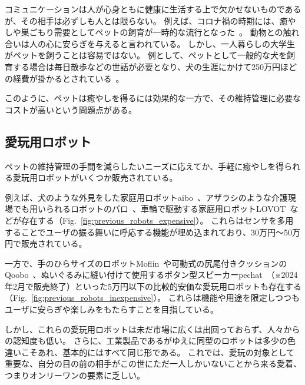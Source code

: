 \documentclass[uplatex,a4paper,12pt]{jsarticle}
\renewcommand{\figurename}{Fig.}
\newcommand{\figref}[1]{\figurename~\ref{#1}}
\begin{document}
コミュニケーションは人が心身ともに健康に生活する上で欠かせないものであるが、その相手は必ずしも人とは限らない。
例えば、コロナ禍の時期には、癒やしや巣ごもり需要としてペットの飼育が一時的な流行となった~\cite{web_pet}。
動物との触れ合いは人の心に安らぎを与えると言われている。
しかし、一人暮らしの大学生がペットを飼うことは容易ではない。
例として、ペットとして一般的な犬を飼育する場合は毎日散歩などの世話が必要となり、犬の生涯にかけて250万円ほどの経費が掛かるとされている~\cite{web_petfood}。

このように、ペットは癒やしを得るには効果的な一方で、その維持管理に必要なコストが高いという問題点がある。


\subsection{愛玩用ロボット}
ペットの維持管理の手間を減らしたいニーズに応えてか、手軽に癒やしを得られる愛玩用ロボットがいくつか販売されている。

例えば、犬のような外見をした家庭用ロボットaibo~\cite{web_aibo}、アザラシのような介護現場でも用いられるロボットのパロ~\cite{web_paro}、車輪で駆動する家庭用ロボットLOVOT~\cite{web_lovot}などが存在する（\figref{fig:previous_robots_expensive}）。
これらはセンサを多用することでユーザの振る舞いに呼応する機能が埋め込まれており、30万円～50万円で販売されている。

一方で、手のひらサイズのロボットMoflin~\cite{web_moflin}や可動式の尻尾付きクッションのQoobo~\cite{web_qoobo}、ぬいぐるみに縫い付けて使用するボタン型スピーカーpechat~\cite{web_pechat}（※2024年2月で販売終了）といった5万円以下の比較的安価な愛玩用ロボットも存在する（\figref{fig:previous_robots_inexpensive}）。
これらは機能や用途を限定しつつもユーザに安らぎや楽しみをもたらすことを目指している。

しかし、これらの愛玩用ロボットは未だ市場に広くは出回っておらず、人々からの認知度も低い。
さらに、工業製品であるがゆえに同型のロボットは多少の色違いこそあれ、基本的にはすべて同じ形である。
これでは、愛玩の対象として重要な、自分の目の前の相手がこの世にただ一人しかいないことから来る愛着、つまりオンリーワンの要素に乏しい。
\end{document}
